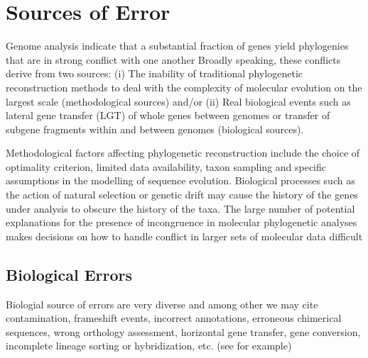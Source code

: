 \section{Sources of Error} \label{sec:error-sources}

%
Genome analysis indicate that a substantial fraction of genes yield phylogenies that are in strong conflict with one another Broadly speaking, these conflicts derive from two sources: (i) The inability of traditional phylogenetic reconstruction methods to deal with the complexity of molecular evolution on the largest scale (methodological sources) and/or (ii) Real biological events such as lateral gene transfer (LGT) of whole genes between genomes or transfer of subgene fragments within and between genomes (biological sources).

Methodological factors affecting phylogenetic reconstruction include the choice of optimality criterion, limited data availability, taxon sampling and specific assumptions in the modelling of sequence evolution. Biological processes such as the action of natural selection or genetic drift may cause the history of the genes under analysis to obscure the history of the taxa. The large number of potential explanations for the presence of incongruence in molecular phylogenetic analyses makes decisions on how to handle conflict in larger sets of molecular data difficult \cite{rokas2003genome}
\subsection{Biological Errors} \label{sec:sampling-error}

Biologial source of errors are very diverse and among other we may cite  contamination,  frameshift  events,  incorrect  annotations,  erroneous  chimerical  sequences,  wrong orthology assessment, horizontal gene transfer, gene conversion, incomplete lineage sorting or hybridization, etc. (see \cite{philippe2017pitfalls} for example)

